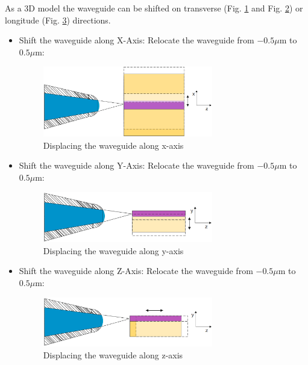 As a 3D model the waveguide can be shifted on transverse (Fig. \ref{fig:shift_x_axis} and Fig. \ref{fig:shift_y_axis}) or longitude (Fig. \ref{fig:shift_z_axis}) directions.
\begin{itemize}
\item Shift the waveguide along X-Axis: Relocate the waveguide from $-0.5\mu$m to $0.5\mu$m:
\begin{figure}[!ht]
\centering
\includegraphics[width=0.7\textwidth]{bilder/shift_x_axis}
\caption{Displacing the waveguide along x-axis}
\label{fig:shift_x_axis}
\end{figure}
\item Shift the waveguide along Y-Axis: Relocate the waveguide from $-0.5\mu$m to $0.5\mu$m:
\begin{figure}[!ht]
\centering
\includegraphics[width=0.7\textwidth]{bilder/shift_y_axis}
\caption{Displacing the waveguide along y-axis}
\label{fig:shift_y_axis}
\end{figure}
\item Shift the waveguide along Z-Axis: Relocate the waveguide from $-0.5\mu$m to $0.5\mu$m:
\begin{figure}[!ht]
\centering
\includegraphics[width=0.7\textwidth]{bilder/shift_z_axis}
\caption{Displacing the waveguide along z-axis}
\label{fig:shift_z_axis}
\end{figure}
\end{itemize}

